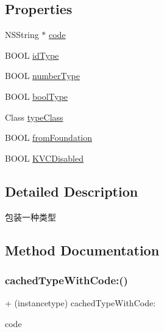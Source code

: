 \subsection*{Properties}
\begin{DoxyCompactItemize}
\item 
N\+S\+String $\ast$ \mbox{\hyperlink{interface_m_j_property_type_a7f3608e565091e37f8ea755a49ed881c}{code}}
\item 
B\+O\+OL \mbox{\hyperlink{interface_m_j_property_type_aa1cc454f05a058f2a14816e5b814ecb6}{id\+Type}}
\item 
B\+O\+OL \mbox{\hyperlink{interface_m_j_property_type_a8742d9193678c399b54f64a642e3bc45}{number\+Type}}
\item 
B\+O\+OL \mbox{\hyperlink{interface_m_j_property_type_a96070759b8a85f5940bc5730923c34f1}{bool\+Type}}
\item 
Class \mbox{\hyperlink{interface_m_j_property_type_a68bf3c1985fa237c0ed426c6821b2430}{type\+Class}}
\item 
B\+O\+OL \mbox{\hyperlink{interface_m_j_property_type_a7bf4430000935250cba27b88e8f06a31}{from\+Foundation}}
\item 
B\+O\+OL \mbox{\hyperlink{interface_m_j_property_type_aa7dcfe8c1167ea62e01fce606b2d78c9}{K\+V\+C\+Disabled}}
\end{DoxyCompactItemize}


\subsection{Detailed Description}
包装一种类型 

\subsection{Method Documentation}
\mbox{\label{interface_m_j_property_type_a1b3d3a2cf0c6c27846d4f8090a7d3d47}} 
\subsubsection{\texorpdfstring{cached\+Type\+With\+Code\+:()}{cachedTypeWithCode:()}\hspace{0.1cm}{\footnotesize\ttfamily [1/3]}}
{\footnotesize\ttfamily + (instancetype) cached\+Type\+With\+Code\+: \begin{DoxyParamCaption}\item[{(N\+S\+String $\ast$)}]{code }\end{DoxyParamCaption}}

